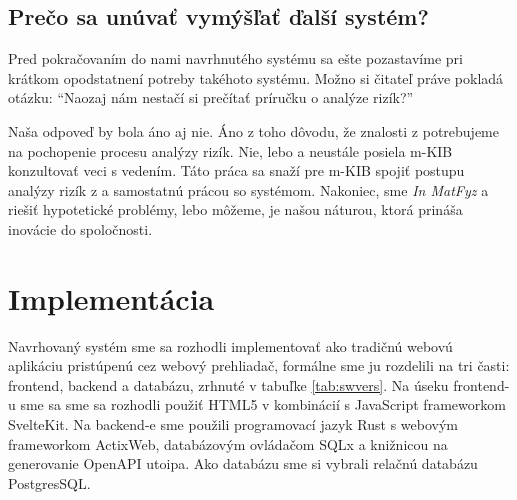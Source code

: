 \subsection*{Prečo sa unúvať vymýšľať ďalší systém?}

Pred pokračovaním do nami navrhnutého systému sa ešte pozastavíme pri krátkom opodstatnení potreby takéhoto systému. Možno si čitateľ
práve pokladá otázku: \enquote{Naozaj nám nestačí si prečítať príručku \cite{BSI3} o analýze rizík?}

Naša odpoveď by bola áno aj nie. Áno z toho dôvodu, že znalosti z \cite{BSI3} potrebujeme na pochopenie procesu analýzy rizík. Nie,
lebo \cite{BSI3} a \cite{GSK} neustále posiela m-KIB konzultovať veci s vedením. Táto práca sa snaží pre m-KIB spojiť postupu analýzy
rizík z \cite{BSI3} a samostatnú prácou so systémom. Nakoniec, sme \emph{In MatFyz} a riešiť hypotetické problémy, lebo môžeme, je
našou náturou, ktorá prináša inovácie do spoločnosti.

\section{Implementácia}

Navrhovaný systém sme sa rozhodli implementovať ako tradičnú webovú aplikáciu pristúpenú cez webový prehliadač, formálne sme ju rozdelili na tri
časti: frontend, backend a databázu, zrhnuté v tabuľke \ref{tab:swvers}. Na úseku frontend-u sme sa sme sa rozhodli použiť HTML5 v kombinácií s
JavaScript frameworkom SvelteKit. Na backend-e sme použili programovací jazyk Rust s webovým frameworkom ActixWeb, databázovým ovládačom SQLx a
knižnicou na generovanie OpenAPI utoipa. Ako databázu sme si vybrali relačnú databázu PostgresSQL.

